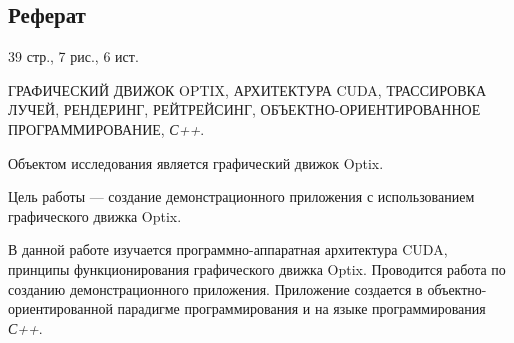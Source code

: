\begin{center}
\section*{Реферат}
\end{center}

\vspace{2em}
39 стр., 7 рис., 6 ист.

\vspace{2em}
ГРАФИЧЕСКИЙ ДВИЖОК OPTIX, АРХИТЕКТУРА CUDA, ТРАССИРОВКА ЛУЧЕЙ, РЕНДЕРИНГ, РЕЙТРЕЙСИНГ, ОБЪЕКТНО-ОРИЕНТИРОВАННОЕ ПРОГРАММИРОВАНИЕ, {\it С++}.

\vspace{2em}
Объектом исследования является графический движок Optix.

Цель работы --- создание демонстрационного приложения с использованием графического движка Optix.

В данной работе изучается программно-аппаратная архитектура CUDA, принципы функционирования графического движка Optix.
Проводится работа по созданию демонстрационного приложения.
Приложение создается в объектно-ори\-ен\-ти\-ро\-ван\-ной парадигме программирования и на языке программирования {\it С++}.
\newpage